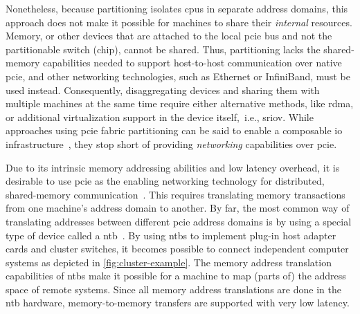 Nonetheless, because partitioning isolates \glspl{cpu} in separate address domains, this approach does not make it possible for machines to share their \emph{internal} resources.
%
Memory, or other devices that are attached to the local \gls{pcie} bus and not the partitionable switch (chip), cannot be shared.
%
Thus, partitioning lacks the shared-memory capabilities needed to support host-to-host communication over native \gls{pcie}, and other networking technologies, such as Ethernet or InfiniBand, must be used instead.
%
Consequently, \gls{disaggregating} devices and sharing them with multiple machines at the same time require either alternative methods, like \gls{rdma}, or additional virtualization support in the device itself,~i.e., \gls{sriov}.
%
While approaches using \gls{pcie} fabric partitioning can be said to enable a composable \gls{io} infrastructure~\cite{Chung2018}, they stop short of providing \emph{networking} capabilities over \gls{pcie}.



Due to its intrinsic memory addressing abilities and low latency overhead, it is desirable to use \gls{pcie} as the enabling networking technology for distributed, shared-memory communication~\cite{Shim2018,url:Meduri2011}.
%
This requires translating memory transactions from one machine's address domain to another.
%
By far, the most common way of translating addresses between different \gls{pcie} address domains is by using a special type of device called a \gls{ntb}~\cite{whitepaper:PLX,whitepaper:Regula2004,Tu2014}.
%
%
By using \glspl{ntb} to implement plug-in host adapter cards and cluster switches, it becomes possible to connect independent computer systems as depicted in \cref{fig:cluster-example}.
%
The memory address translation capabilities of \glspl{ntb} make it possible for a machine to map (parts of) the address space of remote systems.
%
Since all memory address translations are done in the \gls{ntb} hardware, memory-to-memory transfers are supported with very low latency.



